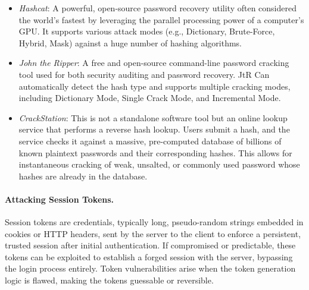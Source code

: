 \begin{itemize}
    \item \textit{Hashcat}: A powerful, open-source password recovery utility often considered the world's fastest by leveraging the parallel processing power of a computer's GPU. It supports various attack modes (e.g., Dictionary, Brute-Force, Hybrid, Mask) against a huge number of hashing algorithms.
    \item \textit{John the Ripper}: A free and open-source command-line password cracking tool used for both security auditing and password recovery. JtR Can automatically detect the hash type and supports multiple cracking modes, including Dictionary Mode, Single Crack Mode, and Incremental Mode.
    \item \textit{CrackStation}: This is not a standalone software tool but an online lookup service that performs a reverse hash lookup. Users submit a hash, and the service checks it against a massive, pre-computed database of billions of known plaintext passwords and their corresponding hashes. This allows for instantaneous cracking of weak, unsalted, or commonly used password whose hashes are already in the database.
\end{itemize}

\paragraph{Attacking Session Tokens.} Session tokens are credentials, typically long, pseudo-random strings embedded in cookies or HTTP headers, sent by the server to the client to enforce a persistent, trusted session after initial authentication. If compromised or predictable, these tokens can be exploited to establish a forged session with the server, bypassing the login process entirely. Token vulnerabilities arise when the token generation logic is flawed, making the tokens guessable or reversible.

